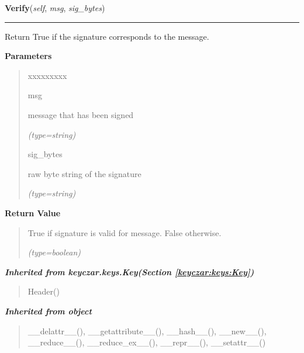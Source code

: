 \hspace{.8\funcindent}\begin{boxedminipage}{\funcwidth}

    \raggedright \textbf{Verify}(\textit{self}, \textit{msg}, \textit{sig\_bytes})

    \vspace{-1.5ex}

    \rule{\textwidth}{0.5\fboxrule}
\setlength{\parskip}{2ex}
    Return True if the signature corresponds to the message.

\setlength{\parskip}{1ex}
      \textbf{Parameters}
      \vspace{-1ex}

      \begin{quote}
        \begin{Ventry}{xxxxxxxxx}

          \item[msg]

          message that has been signed

            {\it (type=string)}

          \item[sig\_bytes]

          raw byte string of the signature

            {\it (type=string)}

        \end{Ventry}

      \end{quote}

      \textbf{Return Value}
    \vspace{-1ex}

      \begin{quote}
      True if signature is valid for message. False otherwise.

      {\it (type=boolean)}

      \end{quote}

    \end{boxedminipage}


\large{\textbf{\textit{Inherited from keyczar.keys.Key\textit{(Section \ref{keyczar:keys:Key})}}}}

\begin{quote}
Header()
\end{quote}

\large{\textbf{\textit{Inherited from object}}}

\begin{quote}
\_\_delattr\_\_(), \_\_getattribute\_\_(), \_\_hash\_\_(), \_\_new\_\_(), \_\_reduce\_\_(), \_\_reduce\_ex\_\_(), \_\_repr\_\_(), \_\_setattr\_\_()
\end{quote}

